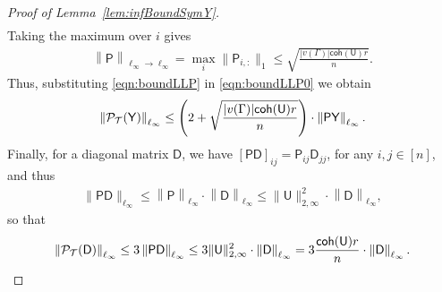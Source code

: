 \documentclass[12pt]{article}
\newcommand{\calP}{{\cal P}}
\newcommand{\calT}{{\cal T}}
\newcommand{\p}[1]{\left(#1\right)}
\newcommand{\norm}[1]{\left\|#1\right\|}
\newcommand{\s}[1]{\mathsf{#1}}
\begin{document}
\begin{proof}[Proof of Lemma~\ref{lem:infBoundSymY}]
\begin{align}
\end{align}
Taking the maximum over $ i $ gives
\begin{align}
\norm{\s{P}}_{\ell_\infty \to \ell_\infty}
= \max_i \| \mathsf{P}_{i,:} \|_1
\leq \sqrt{ \frac{|v(\Gamma)|\s{coh}(\s{U})r}{n}}.\label{eqn:boundLLP}
\end{align}
Thus, substituting \eqref{eqn:boundLLP} in \eqref{eqn:boundLLP0} we obtain
\begin{align}
\norm{\calP_{\calT}(\s{Y})}_{\ell_\infty} \leq \p{2 +\sqrt{ \frac{|v(\Gamma)|\s{coh}(\s{U})r}{n}}}\cdot \norm{\s{P}\s{Y}}_{\ell_\infty}.
\end{align}
Finally, for a diagonal matrix $\s{D}$, we have $[\s{P}\s{D}]_{ij} = \s{P}_{ij} \s{D}_{jj}$, for any $i,j\in[n]$, and thus
\begin{align}
\|\s{P}\s{D}\|_{\ell_\infty} \leq \norm{\s{P}}_{\ell_\infty} \cdot \norm{\s{D}}_{\ell_\infty}
\leq \|\s{U}\|_{2,\infty}^2 \cdot \norm{\s{D}}_{\ell_\infty},
\end{align}
so that
\begin{align}
\norm{\calP_{\calT}(\s{D})}_{\ell_\infty} \leq 3 \norm{\s{P}\s{D}}_{\ell_\infty}
\leq 3 \|\s{U}\|_{2,\infty}^2 \cdot \norm{\s{D}}_{\ell_\infty}
= 3\frac{\s{coh}(\s{U}) r}{n} \cdot\norm{\s{D}}_{\ell_\infty}.
\end{align}
\end{proof}
\end{document}
